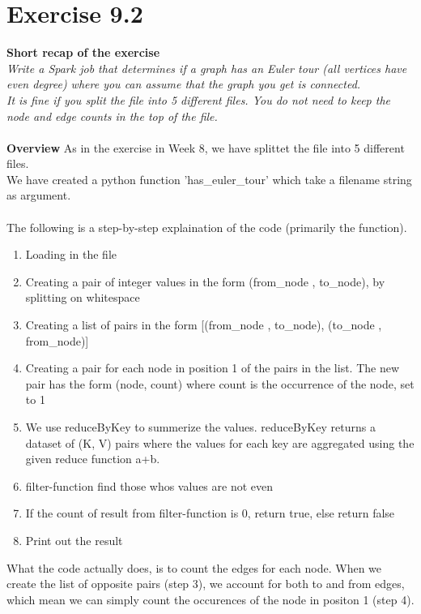 \documentclass{article}
\begin{document}
\section{Exercise 9.2}
\textbf{Short recap of the exercise}\\
\textit{Write a Spark job that determines if a graph has an Euler tour (all vertices have even degree) where you can assume that the graph you get is connected.~\\
It is fine if you split the file into 5 different files. You do not need to keep the node and edge counts in the top of the file.}\\
~\\
\textbf{Overview}
As in the exercise in Week 8, we have splittet the file into 5 different files. ~\\
We have created a python function 'has\_euler\_tour' which take a filename string as argument. \\
~\\
The following is a step-by-step explaination of the code (primarily the function). 
\begin{enumerate}
  \item Loading in the file
  \item Creating a pair of integer values in the form (from\_node , to\_node), by splitting on whitespace
  \item Creating a list of pairs in the form [(from\_node , to\_node), (to\_node , from\_node)]
  \item Creating a pair for each node in position 1 of the pairs in the list. The new pair has the form (node, count) where count is the occurrence of the node, set to 1
  \item We use reduceByKey to summerize the values. reduceByKey returns a dataset of (K, V) pairs where the values for each key are aggregated using the given reduce function a+b. 
  \item filter-function find those whos values are not even
  \item If the count of result from filter-function is 0, return true, else return false 
  \item Print out the result\\
\end{enumerate}
What the code actually does, is to count the edges for each node. When we create the list of opposite pairs (step 3), we account for both to and from edges, which mean we can simply count the occurences of the node in positon 1 (step 4). ~\\
\end{document}
